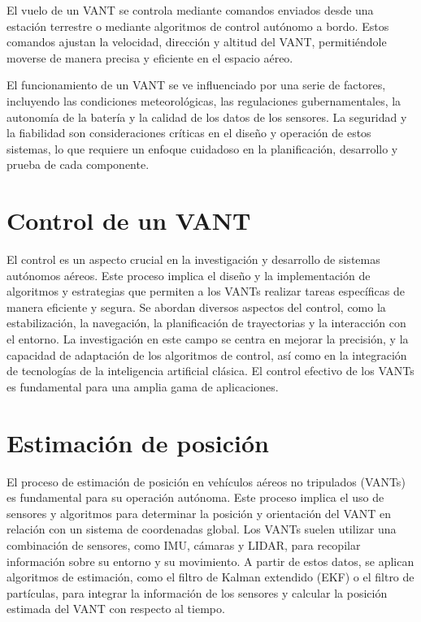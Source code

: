 El vuelo de un VANT se controla mediante comandos enviados desde una estación terrestre o mediante algoritmos de control autónomo a bordo. Estos comandos ajustan la velocidad, dirección y altitud del VANT, permitiéndole moverse de manera precisa y eficiente en el espacio aéreo.

El funcionamiento de un VANT se ve influenciado por una serie de factores, incluyendo las condiciones meteorológicas, las regulaciones gubernamentales, la autonomía de la batería y la calidad de los datos de los sensores. La seguridad y la fiabilidad son consideraciones críticas en el diseño y operación de estos sistemas, lo que requiere un enfoque cuidadoso en la planificación, desarrollo y prueba de cada componente.



\section{Control de un VANT}

El control es un aspecto crucial en la investigación y desarrollo de sistemas autónomos aéreos. Este proceso implica el diseño y la implementación de algoritmos y estrategias que permiten a los VANTs realizar tareas específicas de manera eficiente y segura. Se abordan diversos aspectos del control, como la estabilización, la navegación, la planificación de trayectorias y la interacción con el entorno. La investigación en este campo se centra en mejorar la precisión, y la capacidad de adaptación de los algoritmos de control, así como en la integración de tecnologías de la inteligencia artificial clásica. El control efectivo de los VANTs es fundamental para una amplia gama de aplicaciones.


\section{Estimación de posición}

El proceso de estimación de posición en vehículos aéreos no tripulados (VANTs) es fundamental para su operación autónoma. Este proceso implica el uso de sensores y algoritmos para determinar la posición y orientación del VANT en relación con un sistema de coordenadas global. Los VANTs suelen utilizar una combinación de sensores, como IMU, cámaras y LIDAR, para recopilar información sobre su entorno y su movimiento. A partir de estos datos, se aplican algoritmos de estimación, como el filtro de Kalman extendido (EKF) o el filtro de partículas, para integrar la información de los sensores y calcular la posición estimada del VANT con respecto al tiempo.

